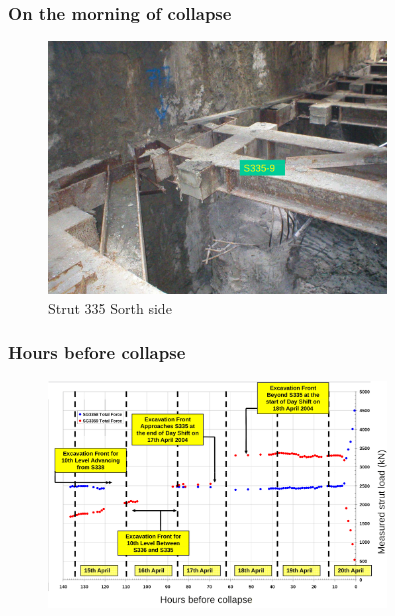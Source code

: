 \documentclass[notes]{beamer}
\begin{document}
\begin{frame}
\frametitle{On the morning of collapse}
\begin{figure}[ht]
	\centering
	\includegraphics[width=0.8\textwidth]{figs/strut-335-south.png}
	\caption*{Strut 335 Sorth side}
\end{figure}
\end{frame}

\begin{frame}
\frametitle{Hours before collapse}
\begin{figure}[ht]
	\centering
	\includegraphics[width=0.8\textwidth]{figs/strut-load-before-collapse.png}
\end{figure}
\end{frame}
\end{document}
